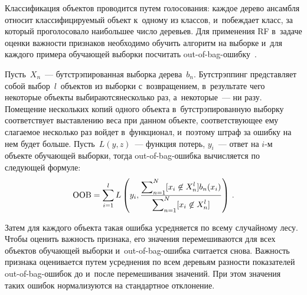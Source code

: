 \begin{multicols}{2}
  Классификация объектов проводится путем голо\-со\-ва\-ния: каждое дерево 
ансамбля относит классифицируемый объект к~одному из классов, 
и~побеждает класс, за который проголосовало наибольшее число деревьев. 
Для применения RF в~задаче оценки важности признаков необходимо обучить 
алгоритм на выборке и~для каждого примера обучающей выборки посчитать 
out-of-bag-ошиб\-ку~\cite{10-sev}. 

Пусть~$X_n$~--- бутстрэпированная 
выборка дере\-ва~$b_n$. Бутстрэппинг представляет собой 
выбор~$l$~объектов из выборки с~возвращением, в~результате чего 
некоторые объекты выбираются\linebreak несколь\-ко раз, а~некоторые~--- ни разу. 
Помещение нескольких копий одного объекта в~бутстрэпированную выборку 
соответствует выставлению веса при данном объекте, соответствующее ему 
слагаемое несколько раз \mbox{войдет} в~функционал, и~поэтому штраф за 
ошибку на нем будет больше. Пусть~$L(y, z)$~--- функция потерь,  
$y_i$~--- ответ на $i$-м объекте обучающей выборки, тогда  
out-of-bag-ошиб\-ка вычисляется по следующей формуле:
  $$
  \mathrm{OOB}=\sum\limits^l_{i=1} L\left( y_i, \displaystyle\frac{\displaystyle \sum\nolimits^N_{n=1} [x_i\not\in 
X^l_n] b_n(x_i)\mathstrut}{\displaystyle \sum\nolimits^N_{n=1} [x_i\not\in X^l_n]\mathstrut}\right)\,.
  $$
  
  Затем для каждого объекта такая ошибка усредняется по всему 
случайному лесу. Чтобы оценить важность признака, его значения 
перемешиваются для всех объектов обучающей выборки  
и~out-of-bag-ошиб\-ка считается снова. Важность признака оценивается 
путем усреднения по всем деревьям разности показателей  
out-of-bag-оши\-бок до и~после перемешивания значений. При этом значения 
таких ошибок нормализуются на стандартное отклонение. 
  

\end{multicols}
